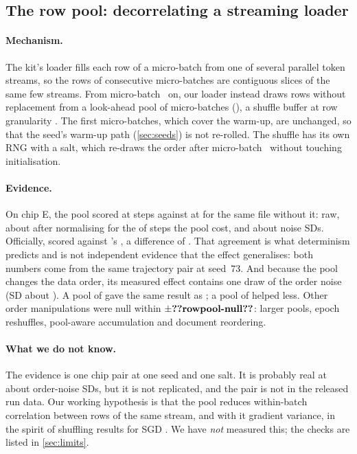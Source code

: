 \subsection{The row pool: decorrelating a streaming loader}
\label{sec:rowpool}

\paragraph{Mechanism.} The kit's loader fills each row of a micro-batch from one of several parallel token streams,
so the rows of consecutive micro-batches are contiguous slices of the same few streams. From
micro-batch~ on, our loader instead draws rows without replacement from a look-ahead pool of
 micro-batches (), a shuffle buffer at row granularity
\citep[cf.][]{xu2022corgipile,mishchenko2020reshuffling}. The first  micro-batches, which cover the
warm-up, are unchanged, so that the seed's warm-up path (\cref{sec:seeds}) is not re-rolled. The shuffle has its own
RNG with a salt, which re-draws the order after micro-batch~ without touching initialisation.

\paragraph{Evidence.} On chip E, the pool scored \docnum{} at \docnum{}
steps against \docnum{} at \docnum{} for the same file without it:
\docnum{} raw, about \docnum{} after normalising for the
\docnum{} of steps the pool cost, and about  noise SDs. Officially, 
scored  against 's , a difference of . That
agreement is what determinism predicts and is not independent evidence that the effect generalises: both numbers come
from the same trajectory pair at seed~73. And because the pool changes the data order, its measured effect contains
one draw of the order noise (SD about \docnum{}). A pool of \docnum{} gave the same
result as ; a pool of \docnum{} helped less. Other order manipulations were null
within $\pm\val{rowpool-null}$\docnum{}: larger pools, epoch reshuffles, pool-aware accumulation and document
reordering.

\paragraph{What we do not know.} The evidence is one chip pair at one seed and one salt. It is probably real at about
 order-noise SDs, but it is not replicated, and the pair is not in the released run data. Our working hypothesis is
that the pool reduces within-batch correlation between rows of the same stream, and with it gradient variance, in the
spirit of shuffling results for SGD \citep{gurbuzbalaban2019reshuffling}. We have \emph{not} measured this; the checks
are listed in \cref{sec:limits}.

